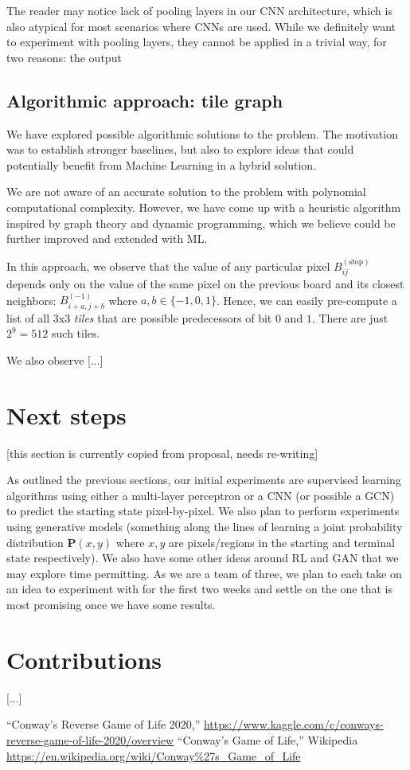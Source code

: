 \documentclass[conference]{IEEEtran}
\begin{document}
The reader may notice lack of pooling layers in our CNN architecture, which is also atypical for most scenarios where CNNs are used. While we definitely want to experiment with pooling layers, they cannot be applied in a trivial way, for two reasons: the output

\subsection{Algorithmic approach: tile graph}
We have explored possible algorithmic solutions to the problem. The motivation was to establish stronger baselines, but also to explore ideas that could potentially benefit from Machine Learning in a hybrid solution.

We are not aware of an accurate solution to the problem with polynomial computational complexity. However, we have come up with a heuristic algorithm inspired by graph theory and dynamic programming, which we believe could be further improved and extended with ML.

In this approach, we observe that the value of any particular pixel $B^{(\text{stop})}_{ij}$ depends only on the value of the same pixel on the previous board and its closest neighbors: $B^{(-1)}_{i+a,j+b}$ where $a, b \in \{-1, 0, 1\}$. Hence, we can easily pre-compute a list of all 3x3 {\it tiles} that are possible predecessors of bit $0$ and $1$. There are just $2^9=512$ such tiles.

We also observe [...]

\section{Next steps}

[this section is currently copied from proposal, needs re-writing]

As outlined the previous sections, our initial experiments are supervised learning algorithms using either a multi-layer perceptron or a CNN (or possible a GCN) to predict the starting state pixel-by-pixel. We also plan to perform experiments using generative models (something along the lines of learning a joint probability distribution $\mathbf P(x, y)$ where $x, y$ are pixels/regions in the starting and terminal state respectively). We also have some other ideas around RL and GAN that we may explore time permitting. As we are a team of three, we plan to each take on an idea to experiment with for the first two weeks and settle on the one that is most promising once we have some results.

\section{Contributions}
[...]

\begin{thebibliography}{00}
 ``Conway's Reverse Game of Life 2020,'' \url{https://www.kaggle.com/c/conways-reverse-game-of-life-2020/overview}
 ``Conway's Game of Life,'' Wikipedia \url{https://en.wikipedia.org/wiki/Conway\%27s_Game_of_Life}
\end{thebibliography}
\end{document}

